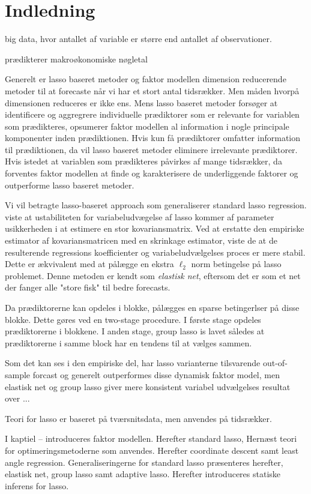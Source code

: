 \chapter{Indledning}

big data, hvor antallet af variable er større end antallet af observationer.

prædikterer makroøkonomiske nøgletal

Generelt er lasso baseret metoder og faktor modellen dimension reducerende metoder til at forecaste når vi har et stort antal tidsrækker.
Men måden hvorpå dimensionen reduceres er ikke ens.
Mens lasso baseret metoder forsøger at identificere og aggregrere individuelle prædiktorer som er relevante for variablen som prædikteres, opsumerer faktor modellen al information i nogle principale komponenter inden prædiktionen.
Hvis kun få prædiktorer omfatter information til prædiktionen, da vil lasso baseret metoder eliminere irrelevante prædiktorer.
Hvis istedet at variablen som prædikteres påvirkes af mange tidsrækker, da forventes faktor modellen at finde og karakterisere de underliggende faktorer og outperforme lasso baseret metoder.


Vi vil betragte lasso-baseret approach som generaliserer standard lasso regression.
\citep{zou_hastie} viste at ustabiliteten for variabeludvægelse af lasso kommer af parameter usikkerheden i at estimere en stor kovariansmatrix.
Ved at erstatte den empiriske estimator af kovariansmatricen med en skrinkage estimator, viste de at de resulterende regressions koefficienter og variabeludvælgelses proces er mere stabil.
Dette er ækvivalent med at pålægge en ekstra \(\ell_2\) norm betingelse på lasso problemet.
Denne metoden er kendt som \textit{elastisk net}, eftersom det er som et net der fanger alle "store fisk" til bedre forecasts.

Da prædiktorerne kan opdeles i blokke, pålægges en sparse betingerlser på disse blokke.
Dette gøres ved en two-stage procedure.
I første stage opdeles prædiktorerne i blokkene. I anden stage, group lasso \citep{group_lasso} is lavet således at prædiktorerne i samme block har en tendens til at vælges sammen.

Som det kan ses i den empiriske del, har lasso varianterne tilsvarende out-of-sample forcast og generelt outperformes disse dynamisk faktor model, men elastisk net og group lasso giver mere konsistent variabel udvælgelses resultat over ...


Teori for lasso er baseret på tværsnitsdata, men anvendes på tidsrækker.


I kaptiel -- introduceres faktor modellen.
Herefter standard lasso,
Hernæst teori for optimeringsmetoderne som anvendes.
Herefter coordinate descent samt least angle regression.
Generaliseringerne for standard lasso præsenteres herefter, elastisk net, group lasso samt adaptive lasso.
Herefter introduceres statiske inferens for lasso.
